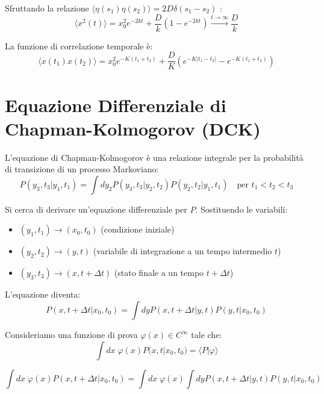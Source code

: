 Sfruttando la relazione $\langle \eta(s_1)\eta(s_2) \rangle = 2D \delta(s_1-s_2)$ :
\begin{equation}
\langle x^2(t) \rangle = x_0^2 e^{-2kt} + \frac{D}{k}(1-e^{-2kt}) \xrightarrow{t\rightarrow\infty} \frac{D}{k}
\end{equation}

La funzione di correlazione temporale è:
\begin{equation}
\langle x(t_1)x(t_2) \rangle = x_0^2 e^{-K(t_1+t_2)} + \frac{D}{K} (e^{-K|t_1-t_2|} - e^{-K(t_1+t_2)})
\end{equation}

\section{Equazione Differenziale di Chapman-Kolmogorov (DCK)}
L'equazione di Chapman-Kolmogorov è una relazione integrale per la probabilità di transizione di un processo Markoviano:
\begin{equation}
P(y_3,t_3|y_1,t_1) = \int dy_2 P(y_3,t_3|y_2,t_2)P(y_2,t_2|y_1,t_1) \quad \text{per } t_1 < t_2 < t_3
\end{equation}

Si cerca di derivare un'equazione differenziale per $P$.
Sostituendo le variabili:
\begin{itemize}
    \item $(y_1,t_1) \rightarrow (x_0,t_0)$ (condizione iniziale)
    \item $(y_2,t_2) \rightarrow (y,t)$ (variabile di integrazione a un tempo intermedio $t$)
    \item $(y_3,t_3) \rightarrow (x, t+\Delta t)$ (stato finale a un tempo $t+\Delta t$)
\end{itemize}

L'equazione diventa:
\begin{equation}
P(x,t+\Delta t|x_0,t_0) = \int dy P(x,t+\Delta t|y,t)P(y,t|x_0,t_0)
\label{eq:42}
\end{equation}

Consideriamo una funzione di prova $\varphi(x) \in C^\infty$ tale che:
\begin{equation}
\int dx \; \varphi(x) P(x,t|x_0,t_0) = \langle P| \varphi \rangle \end{equation}

\begin{equation}
\int dx \; \varphi(x)  P(x,t+\Delta t|x_0,t_0) = \int dx \; \varphi(x) \int dy P(x,t+\Delta t|y,t)P(y,t|x_0,t_0)
\label{eq:43}
\end{equation}

